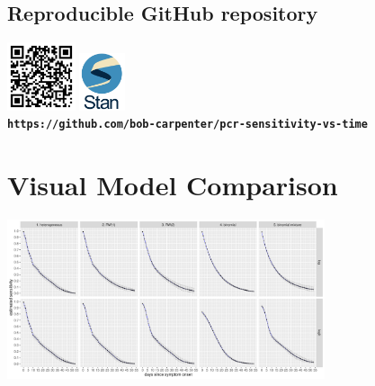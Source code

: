 \documentclass[plainboxedsections]{sciposter}
\begin{document}
\begin{multicols}{2}
\begin{center}
\section{Reproducible GitHub repository}
\null \hfill
\includegraphics[width=0.15\textwidth]{img/qr-code.pdf}
\hfill
\includegraphics[width=0.1\textwidth]{img/stan-logo.png}
\hfill \null
\\
\texttt{\bfseries https://github.com/bob-carpenter/pcr-sensitivity-vs-time}
\end{center}
\end{multicols}

\section{Visual Model Comparison}
\begin{center}
  \includegraphics[width=0.7\textwidth]{img/model-link-comparison.pdf}
\end{center}
\end{document}
